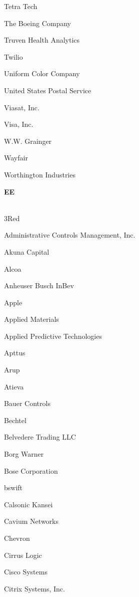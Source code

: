 \documentclass[twoside]{article}
\begin{document}
\begin{center}
\begin{multicols}{5}
\begin{FlushLeft}
\begin{compactitem}
\item Tetra Tech
\item The Boeing Company
\item Truven Health Analytics
\item Twilio
\item Uniform Color Company
\item United States Postal Service
\item Viasat, Inc.
\item Visa, Inc.
\item W.W. Grainger
\item Wayfair
\item Worthington Industries
\end{compactitem}
        \end{FlushLeft}
        \vspace{1em}
        {\fontsize{14}{16}\selectfont \bf EE}\\
        \vspace{-1em}
        ~\hrulefill~
        \vspace{-.9em}
        \begin{FlushLeft}
        \begin{compactitem}
        \item 3Red
\item Administrative Controls Management, Inc.
\item Akuna Capital
\item Alcoa
\item Anheuser Busch InBev
\item Apple
\item Applied Materials
\item Applied Predictive Technologies
\item Apttus
\item Arup
\item Atieva
\item Bauer Controls
\item Bechtel
\item Belvedere Trading LLC
\item Borg Warner
\item Bose Corporation
\item bswift
\item Calsonic Kansei
\item Cavium Networks
\item Chevron
\item Cirrus Logic
\item Cisco Systems
\item Citrix Systems, Inc.

\end{compactitem}
\end{FlushLeft}
\end{multicols}
\end{center}
\end{document}
